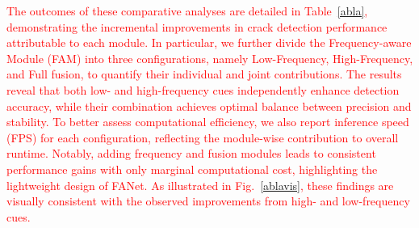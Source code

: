 \documentclass[lettersize,journal,onecolumn,12pt]{IEEEtran}
\begin{document}
\textcolor{red}{The outcomes of these comparative analyses are detailed in Table~\ref{abla}, demonstrating the incremental improvements in crack detection performance attributable to each module.}
\textcolor{red}{
In particular, we further divide the Frequency-aware Module (FAM) into three configurations, namely Low-Frequency, High-Frequency, and Full fusion, to quantify their individual and joint contributions.
The results reveal that both low- and high-frequency cues independently enhance detection accuracy, while their combination achieves optimal balance between precision and stability.
To better assess computational efficiency, we also report inference speed (FPS) for each configuration, reflecting the module-wise contribution to overall runtime.
Notably, adding frequency and fusion modules leads to consistent performance gains with only marginal computational cost, highlighting the lightweight design of FANet.}
\textcolor{red}{As illustrated in Fig.~\ref{ablavis}, these findings are visually consistent with the observed improvements from high- and low-frequency cues.}\\ [10pt]







\clearpage

{\small


}
\end{document}
